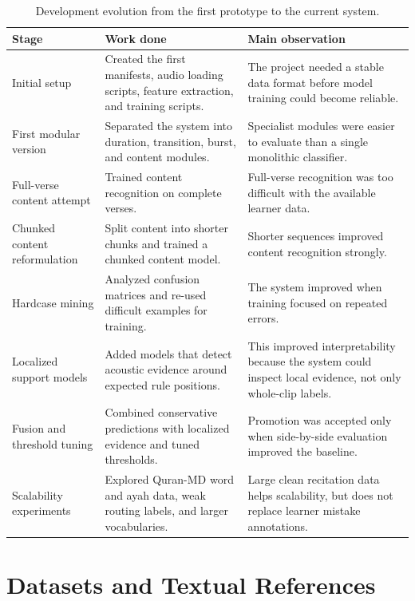 \begin{table}[H]
\centering
\small
\begin{tabularx}{\textwidth}{p{} X X}
\toprule
\textbf{Stage} & \textbf{Work done} & \textbf{Main observation} \\
\midrule
Initial setup &
Created the first manifests, audio loading scripts, feature extraction, and
training scripts. &
The project needed a stable data format before model training could become
reliable. \\
\midrule
First modular version &
Separated the system into duration, transition, burst, and content modules. &
Specialist modules were easier to evaluate than a single monolithic classifier. \\
\midrule
Full-verse content attempt &
Trained content recognition on complete verses. &
Full-verse recognition was too difficult with the available learner data. \\
\midrule
Chunked content reformulation &
Split content into shorter chunks and trained a chunked content model. &
Shorter sequences improved content recognition strongly. \\
\midrule
Hardcase mining &
Analyzed confusion matrices and re-used difficult examples for training. &
The system improved when training focused on repeated errors. \\
\midrule
Localized support models &
Added models that detect acoustic evidence around expected rule positions. &
This improved interpretability because the system could inspect local evidence,
not only whole-clip labels. \\
\midrule
Fusion and threshold tuning &
Combined conservative predictions with localized evidence and tuned thresholds. &
Promotion was accepted only when side-by-side evaluation improved the baseline. \\
\midrule
Scalability experiments &
Explored Quran-MD word and ayah data, weak routing labels, and larger
vocabularies. &
Large clean recitation data helps scalability, but does not replace learner
mistake annotations. \\
\bottomrule
\end{tabularx}
\caption{Development evolution from the first prototype to the current system.}
\label{tab:development_evolution}
\end{table}

\section{Datasets and Textual References}

